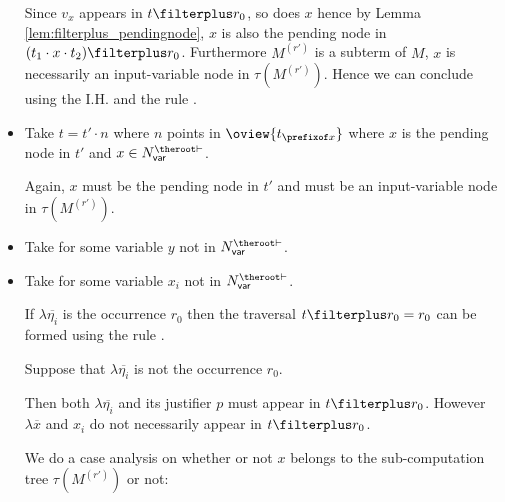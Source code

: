 \begin{itemize}
    Since $v_x$ appears in $t\filterplus r_0$, so does $x$ hence by Lemma \ref{lem:filterplus_pendingnode}, $x$ is also the pending node in $(t_1 \cdot x \cdot t_2)\filterplus r_0$. Furthermore $M^{(r')}$ is a subterm of $M$, $x$ is necessarily an input-variable node in $\tau(M^{(r')})$. Hence we can conclude using the I.H. and the rule .



    \item {}  Take $t =  t' \cdot n$ where $n$ points in $\oview{t_{\prefixof x}}$ where $x$ is the pending node    in $t'$ and $x \in N_{\sf var}^{\theroot\vdash}$.
        
        Again, $x$ must be the pending node in $t'$ and must be an input-variable node in $\tau(M^{(r')})$.
        

    \item {} Take  for some variable $y$ not in $N_{\sf var}^{\theroot\vdash}$.


    \item {}
    Take  for some
        variable $x_i$ not in $N_{\sf var}^{\theroot\vdash}$.

    If $\lambda \overline{\eta_i}$ is the occurrence $r_0$ then
    the traversal $t\filterplus r_0 = r_0$ can be formed using
    the rule .

    Suppose that $\lambda \overline{\eta_i}$ is not the occurrence $r_0$.


    Then both $\lambda \overline{\eta_i}$ and its justifier $p$
    must appear in $t\filterplus r_0$. However $\lambda
    \overline{x}$ and $x_i$ do not necessarily appear in
    $t\filterplus r_0$.

    We do a case analysis on whether or not $x$ belongs to the sub-computation tree  $\tau(M^{(r')})$ or not:
\end{itemize}
